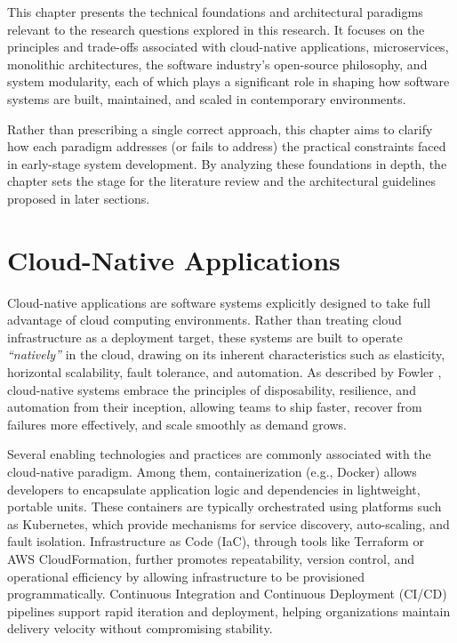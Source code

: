 \label{sec:background}
This chapter presents the technical foundations and architectural paradigms relevant to the research questions explored in this research. It focuses on the principles and trade-offs associated with cloud-native applications, microservices, monolithic architectures, the software industry's open-source philosophy, and system modularity, each of which plays a significant role in shaping how software systems are built, maintained, and scaled in contemporary environments.

Rather than prescribing a single correct approach, this chapter aims to clarify how each paradigm addresses (or fails to address) the practical constraints faced in early-stage system development. By analyzing these foundations in depth, the chapter sets the stage for the literature review and the architectural guidelines proposed in later sections.


\section{Cloud-Native Applications}

Cloud-native applications are software systems explicitly designed to take full advantage of cloud computing environments. Rather than treating cloud infrastructure as a deployment target, these systems are built to operate \textit{\enquote{natively}} in the cloud, drawing on its inherent characteristics such as elasticity, horizontal scalability, fault tolerance, and automation. As described by Fowler \cite{fowler2020}, cloud-native systems embrace the principles of disposability, resilience, and automation from their inception, allowing teams to ship faster, recover from failures more effectively, and scale smoothly as demand grows.

Several enabling technologies and practices are commonly associated with the cloud-native paradigm. Among them, containerization (e.g., Docker) allows developers to encapsulate application logic and dependencies in lightweight, portable units. These containers are typically orchestrated using platforms such as Kubernetes, which provide mechanisms for service discovery, auto-scaling, and fault isolation. Infrastructure as Code (IaC), through tools like Terraform or AWS CloudFormation, further promotes repeatability, version control, and operational efficiency by allowing infrastructure to be provisioned programmatically. Continuous Integration and Continuous Deployment (CI/CD) pipelines support rapid iteration and deployment, helping organizations maintain delivery velocity without compromising stability.

